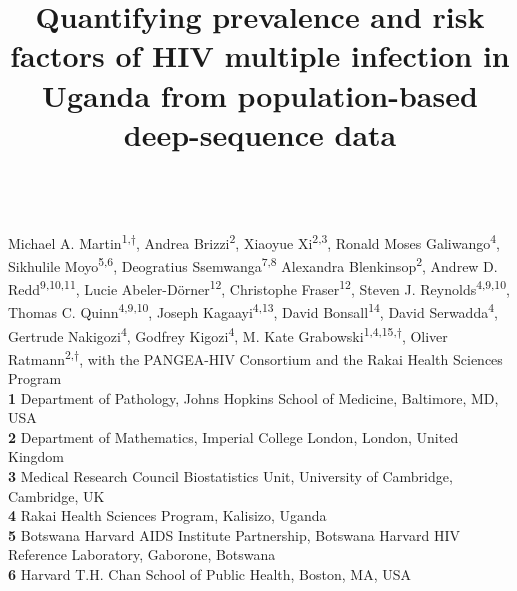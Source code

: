 \documentclass[10pt,letterpaper]{article}
\title{Quantifying prevalence and risk factors of HIV multiple infection in Uganda from population-based deep-sequence data}
\begin{document}

\begin{flushleft}

{\Large\textbf{} 
%
%
}
\newline
\\
Michael A. Martin\textsuperscript{1,$\dagger$},
Andrea Brizzi\textsuperscript{2},
Xiaoyue Xi\textsuperscript{2,3},
Ronald Moses Galiwango\textsuperscript{4},
Sikhulile Moyo\textsuperscript{5,6},
Deogratius Ssemwanga\textsuperscript{7,8}
Alexandra Blenkinsop\textsuperscript{2},
Andrew D. Redd\textsuperscript{9,10,11},
Lucie Abeler-Dörner\textsuperscript{12},
Christophe Fraser\textsuperscript{12},
Steven J. Reynolds\textsuperscript{4,9,10},
Thomas C. Quinn\textsuperscript{4,9,10},
Joseph Kagaayi\textsuperscript{4,13},
David Bonsall\textsuperscript{14},
David Serwadda\textsuperscript{4},
Gertrude Nakigozi\textsuperscript{4},
Godfrey Kigozi\textsuperscript{4},
M. Kate Grabowski\textsuperscript{1,4,15,$\dagger$},
Oliver Ratmann\textsuperscript{2,$\dagger$},
with the PANGEA-HIV Consortium and the Rakai Health Sciences Program
\\
\bigskip
\textbf{1} Department of Pathology, Johns Hopkins School of Medicine, Baltimore, MD, USA
\\
\textbf{2} Department of Mathematics, Imperial College London, London, United Kingdom
\\
\textbf{3} Medical Research Council Biostatistics Unit, University of Cambridge, Cambridge, UK \\

\textbf{4} Rakai Health Sciences Program, Kalisizo, Uganda \\

\textbf{5} Botswana Harvard AIDS Institute Partnership, Botswana Harvard HIV Reference Laboratory, Gaborone, Botswana \\

\textbf{6} Harvard T.H. Chan School of Public Health, Boston, MA, USA \\


\end{flushleft}
\end{document}
